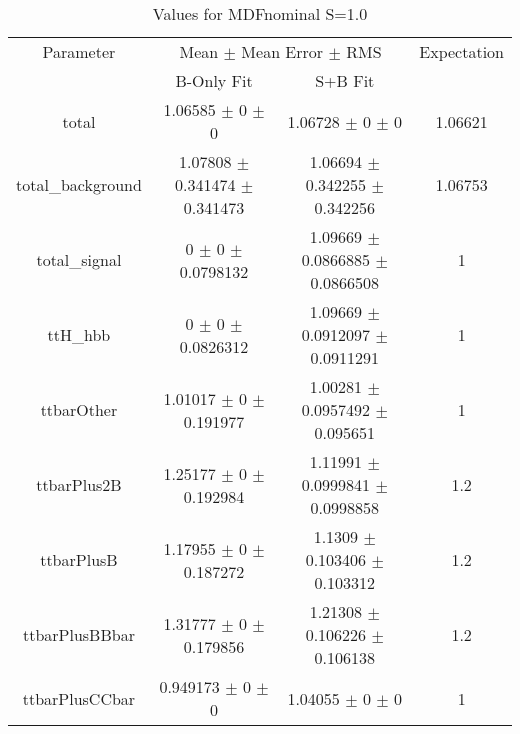 \begin{table}
\centering
\caption{Values for MDFnominal S=1.0}
\begin{tabular}{cccc}
\toprule
Parameter & \multicolumn{2}{c}{Mean $\pm$ Mean Error $\pm$ RMS} & Expectation\\
 & B-Only Fit & S+B Fit & \\
\midrule
total & \num{1.06585} $\pm$ \num{0} $\pm$ \num{0} & \num{1.06728} $\pm$ \num{0} $\pm$ \num{0} & \num{1.06621}\\
total\_background & \num{1.07808} $\pm$ \num{0.341474} $\pm$ \num{0.341473} & \num{1.06694} $\pm$ \num{0.342255} $\pm$ \num{0.342256} & \num{1.06753}\\
total\_signal & \num{0} $\pm$ \num{0} $\pm$ \num{0.0798132} & \num{1.09669} $\pm$ \num{0.0866885} $\pm$ \num{0.0866508} & \num{1}\\
ttH\_hbb & \num{0} $\pm$ \num{0} $\pm$ \num{0.0826312} & \num{1.09669} $\pm$ \num{0.0912097} $\pm$ \num{0.0911291} & \num{1}\\
ttbarOther & \num{1.01017} $\pm$ \num{0} $\pm$ \num{0.191977} & \num{1.00281} $\pm$ \num{0.0957492} $\pm$ \num{0.095651} & \num{1}\\
ttbarPlus2B & \num{1.25177} $\pm$ \num{0} $\pm$ \num{0.192984} & \num{1.11991} $\pm$ \num{0.0999841} $\pm$ \num{0.0998858} & \num{1.2}\\
ttbarPlusB & \num{1.17955} $\pm$ \num{0} $\pm$ \num{0.187272} & \num{1.1309} $\pm$ \num{0.103406} $\pm$ \num{0.103312} & \num{1.2}\\
ttbarPlusBBbar & \num{1.31777} $\pm$ \num{0} $\pm$ \num{0.179856} & \num{1.21308} $\pm$ \num{0.106226} $\pm$ \num{0.106138} & \num{1.2}\\
ttbarPlusCCbar & \num{0.949173} $\pm$ \num{0} $\pm$ \num{0} & \num{1.04055} $\pm$ \num{0} $\pm$ \num{0} & \num{1}\\
\bottomrule
\end{tabular}
\end{table}